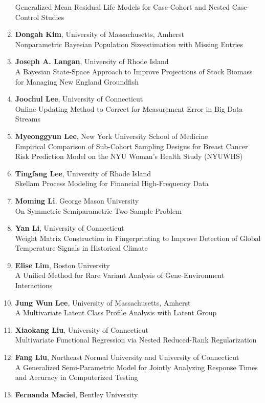 \begin{enumerate}
Generalized Mean Residual Life Models for Case-Cohort and Nested Case-Control Studies
\item \textbf{Dongah Kim}, University of Massachusetts, Amherst \\
Nonparametric Bayesian Population Sizeestimation with Missing Entries
\item \textbf{Joseph A. Langan}, University of Rhode Island \\
A Bayesian State-Space Approach to Improve Projections of Stock Biomass for Managing New England Groundfish
\item \textbf{Joochul Lee}, University of Connecticut \\
Online Updating Method to Correct for Measurement Error in Big Data Streams
\item \textbf{Myeonggyun Lee}, New York University School of Medicine \\
Empirical Comparison of Sub-Cohort Sampling Designs for Breast Cancer Risk Prediction Model on the NYU Woman’s Health Study (NYUWHS)
\item \textbf{Tingfang Lee}, University of Rhode Island \\
Skellam Process Modeling for Financial High-Frequency Data
\item \textbf{Moming Li}, George Mason University \\
On Symmetric Semiparametric Two-Sample Problem
\item \textbf{Yan Li}, University of Connecticut \\
Weight Matrix Construction in Fingerprinting to Improve Detection of Global Temperature Signals in Historical Climate
\item \textbf{Elise Lim}, Boston University \\
A Unified Method for Rare Variant Analysis of Gene-Environment Interactions
\item \textbf{Jung Wun Lee}, University of Massachusetts, Amherst \\
A Multivariate Latent Class Profile Analysis with Latent Group
\item \textbf{Xiaokang Liu}, University of Connecticut \\
Multivariate Functional Regression via Nested Reduced-Rank Regularization
\item \textbf{Fang Liu}, Northeast Normal University and University of Connecticut \\
A Generalized Semi-Parametric Model for Jointly Analyzing Response Times and Accuracy in Computerized Testing
\item \textbf{Fernanda Maciel}, Bentley University \\

\end{enumerate}
